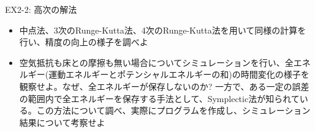 \documentclass[dvipdfmx]{beamer}
\begin{document}
\begin{frame}[t,fragile]{EX2-2: 高次の解法}
  \begin{itemize}
    \setlength{\itemsep}{1em}
  \item[2-2-1] 中点法、3次のRunge-Kutta法、4次のRunge-Kutta法を用いて同様の計算を行い、精度の向上の様子を調べよ
  \item[2-2-2] 空気抵抗も床との摩擦も無い場合についてシミュレーションを行い、全エネルギー(運動エネルギーとポテンシャルエネルギーの和)の時間変化の様子を観察せよ。なぜ、全エネルギーが保存しないのか? 一方で、ある一定の誤差の範囲内で全エネルギーを保存する手法として、Symplectic法が知られている。この方法について調べ、実際にプログラムを作成し、シミュレーション結果について考察せよ
  \end{itemize}
\end{frame}
\end{document}
